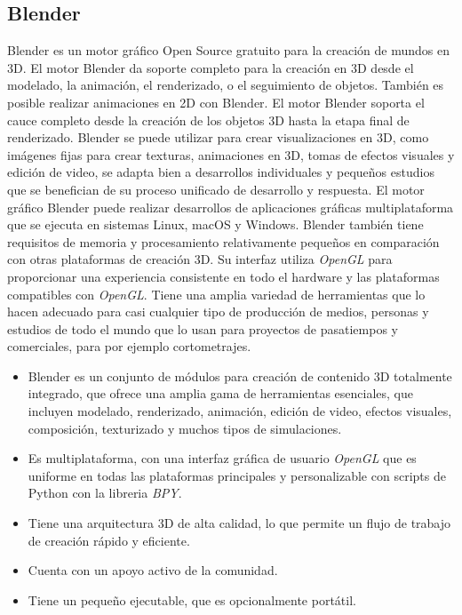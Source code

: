 \documentclass[a4paper]{book}
\begin{document}
\subsection{Blender}
\label{subsec:Blender}

Blender es un motor gráfico Open Source gratuito para la creación de mundos en 3D. El motor Blender da soporte completo
para la creación en 3D desde el modelado, la animación, el renderizado, o el seguimiento de objetos. También es posible
realizar animaciones en 2D con Blender. El motor Blender soporta el cauce completo desde la creación de los objetos 3D
hasta la etapa final de renderizado. Blender se puede utilizar para crear visualizaciones en 3D, como imágenes fijas para
crear texturas, animaciones en 3D, tomas de efectos visuales y edición de video, se adapta bien a desarrollos individuales
y pequeños estudios que se benefician de su proceso unificado de desarrollo y respuesta. El motor gráfico Blender puede realizar
desarrollos de aplicaciones gráficas multiplataforma que se ejecuta en sistemas Linux, macOS y Windows. Blender también tiene requisitos
de memoria y procesamiento relativamente pequeños en comparación con otras plataformas de creación 3D. Su interfaz utiliza \textit{OpenGL}
para proporcionar una experiencia consistente en todo el hardware y las plataformas compatibles con \textit{OpenGL}. Tiene una amplia variedad de
herramientas que lo hacen adecuado para casi cualquier tipo de producción de medios, personas y estudios de todo el mundo que lo
usan para proyectos de pasatiempos y comerciales, para por ejemplo cortometrajes. \cite{blender:_manual}

\begin{itemize}
  \item Blender es un conjunto de módulos para creación de contenido 3D totalmente integrado, que ofrece una amplia gama de
  herramientas esenciales, que incluyen modelado, renderizado, animación, edición de video, efectos visuales, composición,
  texturizado y muchos tipos de simulaciones.

  \item Es multiplataforma, con una interfaz gráfica de usuario \textit{OpenGL} que es uniforme en todas las plataformas principales
  y personalizable con scripts de Python con la libreria \textit{BPY}.

  \item Tiene una arquitectura 3D de alta calidad, lo que permite un flujo de trabajo de creación rápido y eficiente.

  \item Cuenta con un apoyo activo de la comunidad.

  \item Tiene un pequeño ejecutable, que es opcionalmente portátil.
\end{itemize}
\end{document}

